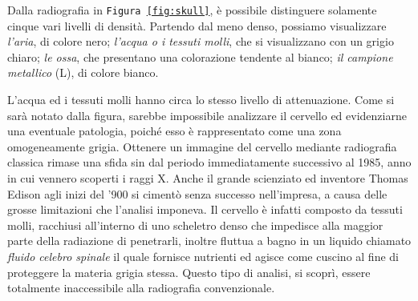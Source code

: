 \documentclass[a4paper,11pt, oneside]{article}
\begin{document}
                        Dalla radiografia in \texttt{Figura \ref{fig:skull}}, è possibile distinguere solamente cinque vari livelli di densità. Partendo dal meno denso, possiamo visualizzare \textit{l'aria}, di colore nero; \textit{l'acqua o i tessuti molli}, che si visualizzano con un grigio chiaro; \textit{le ossa}, che presentano una colorazione tendente al bianco; \textit{il campione metallico} (L), di colore bianco.

                        L’acqua ed i tessuti molli hanno circa lo stesso livello di attenuazione. Come si sarà notato dalla figura, sarebbe impossibile analizzare il cervello ed evidenziarne una eventuale patologia, poiché esso è rappresentato come una zona omogeneamente grigia. Ottenere un immagine del cervello mediante radiografia classica rimase una sfida sin dal periodo immediatamente successivo al 1985, anno in cui vennero scoperti i raggi X. Anche il grande scienziato ed inventore Thomas Edison agli inizi del '900 si cimentò senza successo nell'impresa, a causa delle grosse limitazioni che l'analisi imponeva.\cite{thomas-edison-brain} Il cervello è infatti composto da tessuti molli, racchiusi all’interno di uno scheletro denso che impedisce alla maggior parte della radiazione di penetrarli, inoltre fluttua a bagno in un liquido chiamato \textit{fluido celebro spinale} il quale fornisce nutrienti ed agisce come cuscino al fine di proteggere la materia grigia stessa. Questo tipo di analisi, si scoprì, essere totalmente inaccessibile alla radiografia convenzionale.
                        
\end{document}
